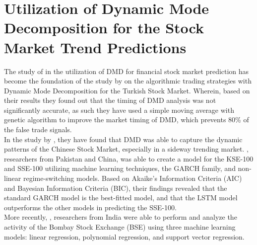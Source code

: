 \section{Utilization of Dynamic Mode Decomposition for the Stock Market Trend Predictions}
\label{sec:util_dmd}
The study of  in the utilization of DMD for financial stock market 
prediction has become the foundation of the study by  
on the algorithmic trading strategies with Dynamic Mode Decomposition 
for the Turkish Stock Market. Wherein, based on their results they found out 
that the timing of DMD analysis was not significantly accurate, as such they 
have used a simple moving average with genetic algorithm to improve the market 
timing of DMD, which prevents 80\% of the false trade signals.
\\

In the study by , they have found that DMD was able to capture the 
dynamic patterns of the Chinese Stock Market, especially in a sideway trending market.
, researchers from Pakistan and China, was able to 
create a model for the KSE-100 and SSE-100 utilizing machine learning techniques, the GARCH 
family, and non-linear regime-switching models. Based on Akaike's Information Criteria (AIC) 
and Bayesian Information Criteria (BIC), their findings revealed that the standard GARCH model 
is the best-fitted model, and that the LSTM model outperforms the other models in predicting 
the SSE-100.
\\

More recently, , researchers from India were able 
to perform and analyze the activity of the Bombay Stock Exchange (BSE) using three machine learning models: 
linear regression, polynomial regression, and support vector regression.
\\

